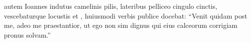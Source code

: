 \documentclass[12pt]{article}
\newcommand{\bv}[1]{\linenumannotation{#1}}
\begin{document}
	\beginnumbering
	\pstart
  \bv{6}  autem Ioannes indutus camelinis pilis, lateribus pelliceo cingulo cinctis, vescebaturque locustis et ,  huiusmodi verbis publice docebat:\bv{7} “Venit quidam post me, adeo me praestantior, ut ego non sim dignus qui eius calceorum corrigiam pronus solvam.”
	\pend
	\endnumbering
\end{document}
